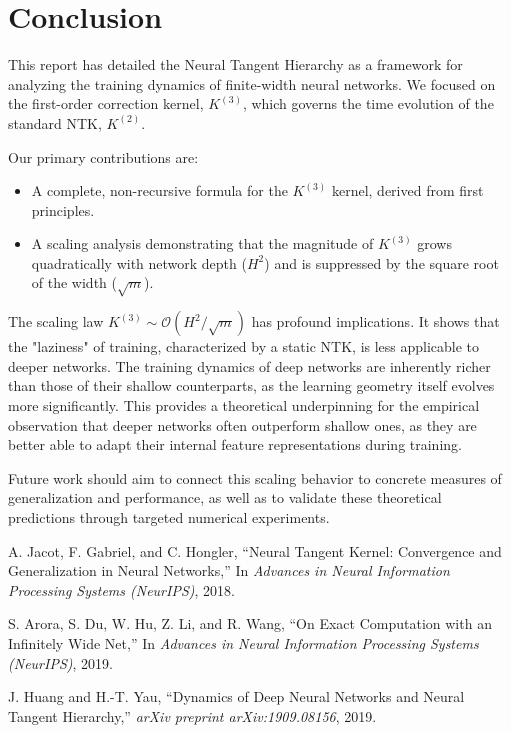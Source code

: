 \documentclass{article}
\newcommand{\Order}{\mathcal{O}}
\begin{document}
\section{Conclusion}

This report has detailed the Neural Tangent Hierarchy as a framework for analyzing the training dynamics of finite-width neural networks. We focused on the first-order correction kernel, $K^{(3)}$, which governs the time evolution of the standard NTK, $K^{(2)}$.

Our primary contributions are:
\begin{itemize}
    \item A complete, non-recursive formula for the $K^{(3)}$ kernel, derived from first principles.
    \item A scaling analysis demonstrating that the magnitude of $K^{(3)}$ grows quadratically with network depth ($H^2$) and is suppressed by the square root of the width ($\sqrt{m}$).
\end{itemize}

The scaling law $K^{(3)} \sim \Order(H^2/\sqrt{m})$ has profound implications. It shows that the "laziness" of training, characterized by a static NTK, is less applicable to deeper networks. The training dynamics of deep networks are inherently richer than those of their shallow counterparts, as the learning geometry itself evolves more significantly. This provides a theoretical underpinning for the empirical observation that deeper networks often outperform shallow ones, as they are better able to adapt their internal feature representations during training.

Future work should aim to connect this scaling behavior to concrete measures of generalization and performance, as well as to validate these theoretical predictions through targeted numerical experiments.


\begin{thebibliography}{9}

A. Jacot, F. Gabriel, and C. Hongler,
\newblock ``Neural Tangent Kernel: Convergence and Generalization in Neural Networks,''
\newblock In \emph{Advances in Neural Information Processing Systems (NeurIPS)}, 2018.

S. Arora, S. Du, W. Hu, Z. Li, and R. Wang,
\newblock ``On Exact Computation with an Infinitely Wide Net,''
\newblock In \emph{Advances in Neural Information Processing Systems (NeurIPS)}, 2019.

J. Huang and H.-T. Yau,
\newblock ``Dynamics of Deep Neural Networks and Neural Tangent Hierarchy,''
\newblock \emph{arXiv preprint arXiv:1909.08156}, 2019.

\end{thebibliography}
\end{document}

